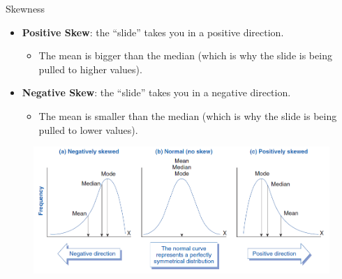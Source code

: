 \documentclass[
  ignorenonframetext,
]{beamer}
\providecommand{\tightlist}{%
  \setlength{\itemsep}{0pt}\setlength{\parskip}{0pt}}
\begin{document}
\begin{frame}{Skewness}
\label{skewness-3}
\begin{itemize}
\tightlist
\item
  \textbf{Positive Skew}: the ``slide'' takes you in a positive
  direction.

  \begin{itemize}
  \tightlist
  \item
    The mean is bigger than the median (which is why the slide is being
    pulled to higher values).
  \end{itemize}
\end{itemize}

\begin{itemize}
\tightlist
\item
  \textbf{Negative Skew}: the ``slide'' takes you in a negative
  direction.

  \begin{itemize}
  \tightlist
  \item
    The mean is smaller than the median (which is why the slide is being
    pulled to lower values).
  \end{itemize}
\end{itemize}

\begin{figure}
\includegraphics[width=0.8\linewidth]{fig/skewness} \end{figure}
\end{frame}
\end{document}
